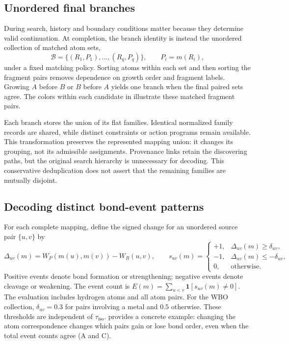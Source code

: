 \subsection{Unordered final branches}

During search, history and boundary conditions matter because they determine valid continuation. At completion, the branch identity is instead the unordered collection of matched atom sets,
\begin{equation}
 \mathcal B=\{(R_1,P_1),\ldots,(R_q,P_q)\},
 \qquad P_i=m(R_i),
 \label{eq:branch}
\end{equation}
under a fixed matching policy. Sorting atoms within each set and then sorting the fragment pairs removes dependence on growth order and fragment labels. Growing $A$ before $B$ or $B$ before $A$ yields one branch when the final paired sets agree. The colors within each candidate in  illustrate these matched fragment pairs.

Each branch stores the union of its flat families. Identical normalized family records are shared, while distinct constraints or action programs remain available. This transformation preserves the represented mapping union: it changes its grouping, not its admissible assignments. Provenance links retain the discovering paths, but the original search hierarchy is unnecessary for decoding. This conservative deduplication does not assert that the remaining families are mutually disjoint.

\subsection{Decoding distinct bond-event patterns}

For each complete mapping, define the signed change for an unordered source pair $\{u,v\}$ by
\begin{equation}
 \Delta_{uv}(m)=W_P(m(u),m(v))-W_R(u,v),\qquad
 s_{uv}(m)=
 \begin{cases}
 +1,&\Delta_{uv}(m)\geq\delta_{uv},\\
 -1,&\Delta_{uv}(m)\leq-\delta_{uv},\\
 0,&\text{otherwise}.
 \end{cases}
 \label{eq:events}
\end{equation}
Positive events denote bond formation or strengthening; negative events denote cleavage or weakening. The event count is $E(m)=\sum_{u<v}\mathbf 1[s_{uv}(m)\ne0]$. The evaluation includes hydrogen atoms and all atom pairs. For the WBO collection, $\delta_{uv}=0.3$ for pairs involving a metal and $0.5$ otherwise. These thresholds are independent of $\tau_{\mathrm{iso}}$.  provides a concrete example: changing the atom correspondence changes which pairs gain or lose bond order, even when the total event counts agree (A and C).


